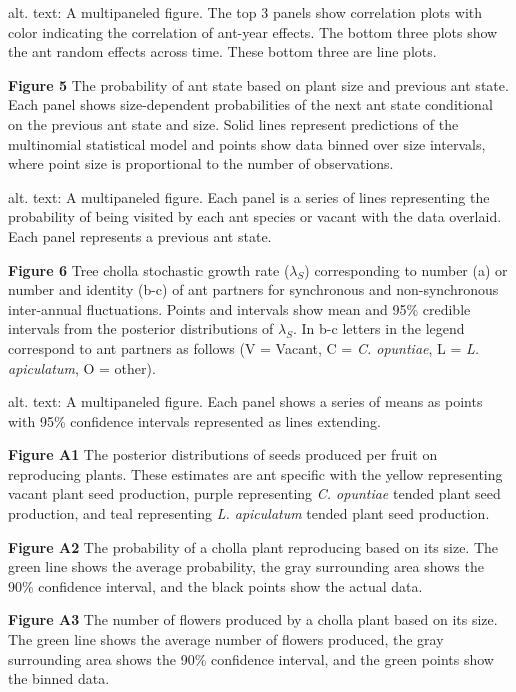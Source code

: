 \documentclass[11pt]{article}
\begin{document}
alt. text: A multipaneled figure. The top 3 panels show correlation plots with color indicating the correlation of ant-year effects. The bottom three plots show the ant random effects across time. These bottom three are line plots.

\bigskip

\textbf{Figure 5} The probability of ant state based on plant size and previous ant state. Each panel shows size-dependent probabilities of the next ant state conditional on the previous ant state and size. Solid lines represent predictions of the multinomial statistical model and points show data binned over size intervals, where point size is proportional to the number of observations.

alt. text: A multipaneled figure. Each panel is a series of lines representing  the probability of being visited by each ant species or vacant with the data overlaid. Each panel represents a previous ant state.

\bigskip

\textbf{Figure 6} Tree cholla stochastic growth rate ($\lambda_{S}$) corresponding to number (a) or number and identity (b-c) of ant partners for synchronous and non-synchronous inter-annual fluctuations. Points and intervals show mean and 95\% credible intervals from the posterior distributions of $\lambda_{S}$. In b-c letters in the legend correspond to ant partners as follows (V = Vacant, C = \textit{C. opuntiae}, L = \textit{L. apiculatum}, O = other).

alt. text: A multipaneled figure. Each panel shows a series of means as points with 95\% confidence intervals represented as lines extending. 

\bigskip

\textbf{Figure A1} The posterior distributions of seeds produced per fruit on reproducing plants.
These estimates are ant specific with the yellow representing vacant plant seed production, purple representing \textit{C. opuntiae} tended plant seed production, and teal representing \textit{L. apiculatum} tended plant seed production.

\bigskip

\textbf{Figure A2} The probability of a cholla plant reproducing based on its size. The green line shows the average probability, the gray surrounding area shows the 90\% confidence interval, and the black points show the actual data. 

\bigskip

\textbf{Figure A3} The number of flowers produced by a cholla plant based on its size. The green line shows the average number of flowers produced, the gray surrounding area shows the 90\% confidence interval, and the green points show the binned data.
\end{document}
